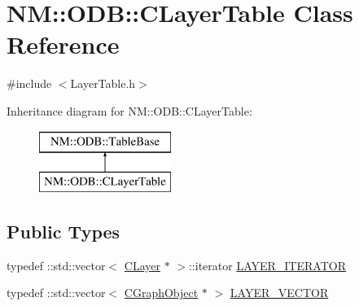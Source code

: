 \hypertarget{class_n_m_1_1_o_d_b_1_1_c_layer_table}{}\section{N\+M\+:\+:O\+D\+B\+:\+:C\+Layer\+Table Class Reference}
\label{class_n_m_1_1_o_d_b_1_1_c_layer_table}


{\ttfamily \#include $<$Layer\+Table.\+h$>$}

Inheritance diagram for N\+M\+:\+:O\+D\+B\+:\+:C\+Layer\+Table\+:\begin{figure}[H]
\begin{center}
\leavevmode
\includegraphics[height=2.000000cm]{class_n_m_1_1_o_d_b_1_1_c_layer_table}
\end{center}
\end{figure}
\subsection*{Public Types}
\begin{DoxyCompactItemize}
\item 
typedef \+::std\+::vector$<$ \hyperlink{class_n_m_1_1_o_d_b_1_1_c_layer}{C\+Layer} $\ast$ $>$\+::iterator \hyperlink{class_n_m_1_1_o_d_b_1_1_c_layer_table_a434102a84f3ecccf339809c0060fa80f}{L\+A\+Y\+E\+R\+\_\+\+I\+T\+E\+R\+A\+T\+O\+R}
\item 
typedef \+::std\+::vector$<$ \hyperlink{class_n_m_1_1_o_d_b_1_1_c_graph_object}{C\+Graph\+Object} $\ast$ $>$ \hyperlink{class_n_m_1_1_o_d_b_1_1_c_layer_table_ab1a405cd3c4cc2536d1af07fe96ddd92}{L\+A\+Y\+E\+R\+\_\+\+V\+E\+C\+T\+O\+R}
\end{DoxyCompactItemize}
